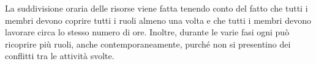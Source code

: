 La suddivisione oraria delle risorse viene fatta tenendo conto del fatto che tutti i membri devono coprire tutti i ruoli almeno una volta e che tutti i membri devono lavorare circa lo stesso numero di ore. Inoltre, durante le varie fasi ogni  può ricoprire più ruoli, anche contemporaneamente, purché non si presentino dei conflitti tra le attività svolte. \\









\pagebreak